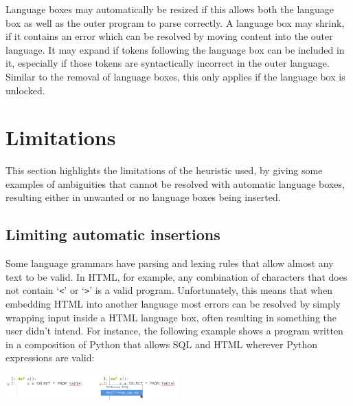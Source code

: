 \documentclass[sigplan,screen]{acmart}\settopmatter{printfolios=true,printccs=false,printacmref=false}
\newcommand{\qtt}[1]{`\texttt{#1}'\xspace}
\begin{document}
Language boxes may automatically be resized if this allows both the language box as
well as the outer program to parse correctly. A language box may shrink, if it
contains an error which can be resolved by moving content into the outer
language. It may expand if tokens following the language box can be included in it,
especially if those tokens are syntactically incorrect in the outer language.
Similar to the removal of language boxes, this only applies if the language box
is unlocked.


\section{Limitations}
\label{sec_lbox_limitations}

This section highlights the limitations of the heuristic used, by giving some
examples of ambiguities that cannot be resolved with automatic language boxes,
resulting either in unwanted or no language boxes being inserted.


\subsection{Limiting automatic insertions}
\label{subsec:limitingautoinserts}

Some language grammars have parsing and lexing rules that allow almost any text to be valid.
In HTML, for example, any combination of characters that does not contain
\qtt{<} or \qtt{>} is a valid program. Unfortunately, this means that when
embedding HTML into another language most errors can be resolved by simply wrapping input inside a
HTML language box, often resulting in something the user didn't intend. For
instance, the following example shows a program written in a composition of
Python that allows SQL and HTML wherever Python expressions are valid:

\begin{center}
\includegraphics[width=0.5\textwidth]{images/auto_html.png}
\end{center}
\end{document}
